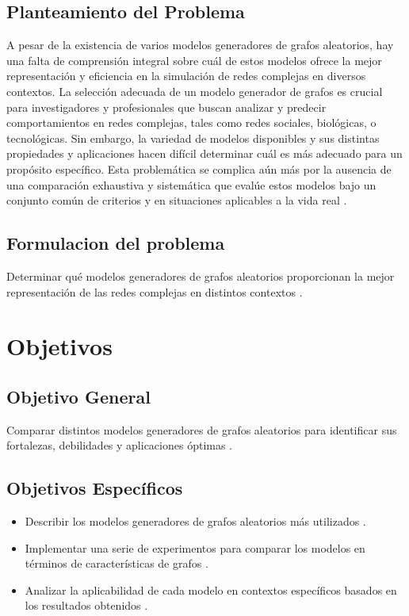 \subsection{Planteamiento del Problema}
A pesar de la existencia de varios modelos generadores de grafos aleatorios, hay una falta de comprensión integral sobre cuál de estos modelos ofrece la mejor representación y eficiencia en la simulación de redes complejas en diversos contextos. La selección adecuada de un modelo generador de grafos es crucial para investigadores y profesionales que buscan analizar y predecir comportamientos en redes complejas, tales como redes sociales, biológicas, o tecnológicas. Sin embargo, la variedad de modelos disponibles y sus distintas propiedades y aplicaciones hacen difícil determinar cuál es más adecuado para un propósito específico. Esta problemática se complica aún más por la ausencia de una comparación exhaustiva y sistemática que evalúe estos modelos bajo un conjunto común de criterios y en situaciones aplicables a la vida real \citep{Wilson2008, Bollobas2001, Caldarelli2007} .

\subsection{Formulacion del problema}
Determinar qué modelos generadores de grafos aleatorios proporcionan la mejor representación de las redes complejas en distintos contextos .


\section{Objetivos}
\subsection{Objetivo General}
Comparar distintos modelos generadores de grafos aleatorios para identificar sus fortalezas, debilidades y aplicaciones óptimas .
\subsection{Objetivos Específicos}
\begin{itemize}
    \item Describir los modelos generadores de grafos aleatorios más utilizados .
    \item Implementar una serie de experimentos para comparar los modelos en términos de características de grafos .
    \item Analizar la aplicabilidad de cada modelo en contextos específicos basados en los resultados obtenidos .
\end{itemize}

